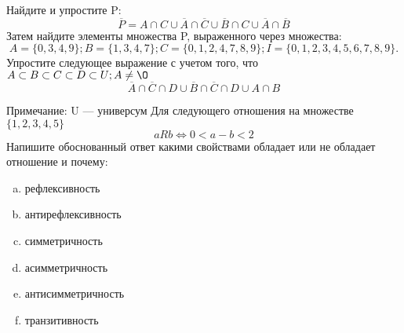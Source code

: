 \documentclass[10pt]{exam}
\begin{document}
\begin{questions}
\question
Найдите и упростите P:
\begin{equation*}
\overline{P} = A \cap C \cup \overline{A} \cap \overline{C} \cup \overline{B} \cap C \cup \overline{A} \cap \overline{B}
\end{equation*}
Затем найдите элементы множества P, выраженного через множества:
\begin{equation*}
A = \{0, 3, 4, 9\}; 
B = \{1, 3, 4, 7\};
C = \{0, 1, 2, 4, 7, 8, 9\};
I = \{0, 1, 2, 3, 4, 5, 6, 7, 8, 9\}.
\end{equation*}\question
Упростите следующее выражение с учетом того, что $A\subset B \subset C \subset D \subset U; A \neq \O$
\begin{equation*}
\overline{A} \cap \overline{C} \cap D \cup \overline{B} \cap \overline{C} \cap D \cup A \cap B
\end{equation*}

Примечание: U — универсум\question
Для следующего отношения на множестве $\{1, 2, 3, 4, 5\}$ 
\begin{equation*}
aRb \iff 0 < a-b<2
\end{equation*}
Напишите обоснованный ответ какими свойствами обладает или не обладает отношение и почему:   
\begin{enumerate} [a)]\setcounter{enumi}{0}
\item рефлексивность
\item антирефлексивность
\item симметричность
\item асимметричность
\item антисимметричность
\item транзитивность
\end{enumerate}


\end{questions}
\end{document}
